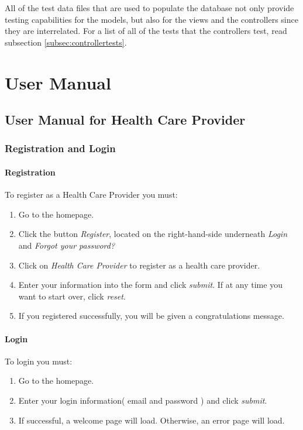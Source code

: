 \documentclass[10pt]{report}
\begin{document}
All of the test data files that are used to populate the database not only provide testing capabilities for the models, but also for the views and the controllers since they are interrelated.  For a list of all of the tests that the controllers test, read subsection \ref{subsec:controllertests}.




\part{User Manual}

\chapter{User Manual for Health Care Provider}

\section{Registration and Login}
\subsection{Registration}
To register as a Health Care Provider you must:
\begin{enumerate}
\item Go to the homepage.
\item Click the button \textit{Register}, located on the right-hand-side underneath \textit{Login} and \textit{Forgot your password?}
\item Click on \textit{Health Care Provider} to register as a health care provider.
\item Enter your information into the form and click \textit{submit}. If at any time you want to start over, click \textit{reset}.
\item If you registered successfully, you will be given a congratulations message.
\end{enumerate}
\subsection{Login}
To login you must:
\begin{enumerate}
\item Go to the homepage.
\item Enter your login information( email and password ) and click \textit{submit}.
\item If successful, a welcome page will load. Otherwise, an error page will load. 
\end{enumerate}
\end{document}
